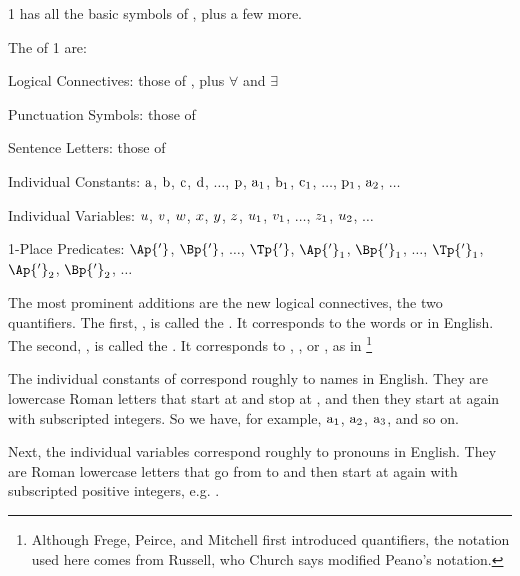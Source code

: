 \GQL{}1 has all the basic symbols of \GSL{}, plus a few more. 
\begin{majorILnc}{}
The  of \GQL{}1 are:
\begin{cenumerate}
\item Logical Connectives: those of \GSL{}, plus $\forall$ and $\exists$
\item Punctuation Symbols: those of \GSL{}
\item Sentence Letters: those of \GSL{}
\item Individual Constants: $\mathrm{a}$, $\mathrm{b}$, $\mathrm{c}$, $\mathrm{d}$, $\ldots$, $\mathrm{p}$, $\mathrm{a}_1$, $\mathrm{b}_1$, $\mathrm{c}_1$, $\ldots$, $\mathrm{p}_1$, $\mathrm{a}_2$, $\ldots$
\item Individual Variables: $u$, $v$, $w$, $x$, $y$, $z$, $u_1$, $v_1$, $\ldots$, $z_1$, $u_2$, $\ldots$
\item 1-Place Predicates: $\Ap{'}$, $\Bp{'}$, $\ldots$, $\Tp{'}$, $\Ap{'}_1$, $\Bp{'}_1$, $\ldots$, $\Tp{'}_1$, $\Ap{'}_2$, $\Bp{'}_2$, $\ldots$
\end{cenumerate}
\end{majorILnc}
\noindent{}The most prominent additions are the new logical connectives, the two quantifiers.  The first, \mention{$\forall$}, is called the . 
It corresponds to the words  or  in English. 
The second, \mention{$\exists$}, is called the . 
It corresponds to , , or , as in \footnote{Although Frege, Peirce, and Mitchell first introduced quantifiers, the notation used here comes from Russell, who Church \citeyearpar[288]{Church1956} says modified Peano's notation.}

The individual constants of \GQL{} correspond roughly to names in English. 
They are lowercase Roman letters that start at  and stop at , and then they start at  again with subscripted integers. So we have, for example, $\mathrm{a_1}$, $\mathrm{a_2}$, $\mathrm{a_3}$, and so on. 

Next, the individual variables correspond roughly to pronouns in English. 
They are Roman lowercase letters that go from  to  and then start at  again with subscripted positive integers, e.g. . 

